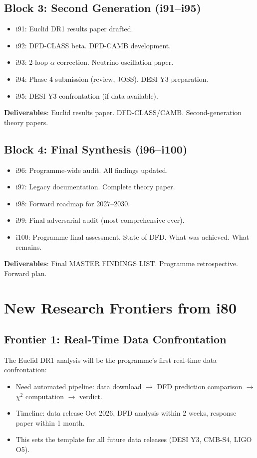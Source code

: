 \documentclass[11pt,a4paper]{article}
\begin{document}
\subsection{Block 3: Second Generation (i91--i95)}
\begin{itemize}[nosep]
\item i91: Euclid DR1 results paper drafted.
\item i92: DFD-CLASS beta. DFD-CAMB development.
\item i93: 2-loop $\alpha$ correction. Neutrino oscillation paper.
\item i94: Phase 4 submission (review, JOSS). DESI Y3 preparation.
\item i95: DESI Y3 confrontation (if data available).
\end{itemize}

\textbf{Deliverables}: Euclid results paper. DFD-CLASS/CAMB. Second-generation theory papers.

\subsection{Block 4: Final Synthesis (i96--i100)}
\begin{itemize}[nosep]
\item i96: Programme-wide audit. All findings updated.
\item i97: Legacy documentation. Complete theory paper.
\item i98: Forward roadmap for 2027--2030.
\item i99: Final adversarial audit (most comprehensive ever).
\item i100: Programme final assessment. State of DFD. What was achieved. What remains.
\end{itemize}

\textbf{Deliverables}: Final MASTER FINDINGS LIST. Programme retrospective. Forward plan.

\section{New Research Frontiers from i80}

\subsection{Frontier 1: Real-Time Data Confrontation}
The Euclid DR1 analysis will be the programme's first real-time data confrontation:
\begin{itemize}[nosep]
\item Need automated pipeline: data download $\to$ DFD prediction comparison $\to$ $\chi^2$ computation $\to$ verdict.
\item Timeline: data release Oct 2026, DFD analysis within 2 weeks, response paper within 1 month.
\item This sets the template for all future data releases (DESI Y3, CMB-S4, LIGO O5).
\end{itemize}
\end{document}
